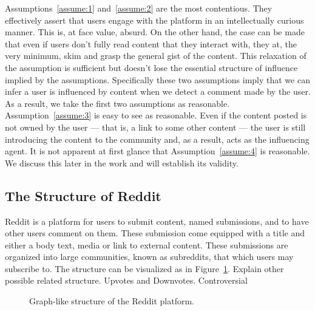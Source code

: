 \documentclass[letterpaper, 10 pt, conference]{ieeeconf}
\theoremstyle{plain}
\newcommand{\red}{\color{red}}
\begin{document}
Assumptions~\ref{assume:1} and~\ref{assume:2} are the most contentious. They effectively assert that users engage with the platform in an intellectually curious manner. This is, at face value, absurd. On the other hand, the case can be made that even if users don't fully read content that they interact with, they at, the very minimum, skim and grasp the general gist of the content. This relaxation of the assumption is sufficient but doesn't lose the essential structure of influence implied by the assumptions. Specifically these two assumptions imply that we can infer a user is influenced by content when we detect a comment made by the user. As a result, we take the first two assumptions as reasonable. Assumption~\ref{assume:3} is easy to see as reasonable. Even if the content posted is not owned by the user --- that is, a link to some other content --- the user is still introducing the content to the community and, as a result, acts as the influencing agent. It is not apparent at first glance that Assumption~\ref{assume:4} is reasonable. We discuss this later in the work and will establish its validity.

\subsection{The Structure of Reddit}
Reddit is a platform for users to submit content, named submissions, and to have other users comment on them. These submission come equipped with a title and either a body text, media or link to external content. These submissions are organized into large communities, known as subreddits, that which users may subscribe to. The structure can be visualized as in Figure~\ref{fig:model:reddit}.
{\red Explain other possible related structure. Upvotes and Downvotes. Controversial}

\begin{figure}
  \centering
  \caption{Graph-like structure of the Reddit platform.}
  \label{fig:model:reddit}
\end{figure}
\end{document}
